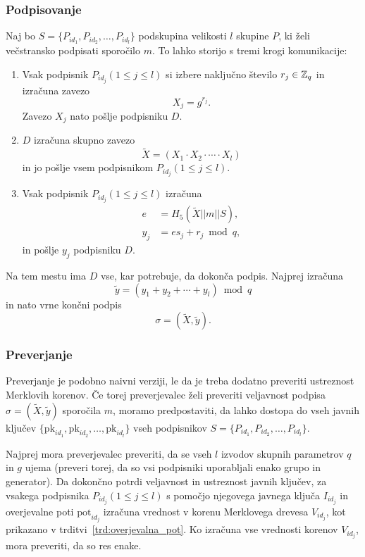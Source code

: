 \subsubsection{Podpisovanje}
Naj bo $S = \{P_{id_1}, P_{id_2}, \dots, P_{id_l}\}$ podskupina velikosti $l$ skupine $P$, ki želi
večstransko podpisati sporočilo $m$. To lahko storijo s tremi krogi komunikacije:
\begin{enumerate}
    \item Vsak podpisnik $P_{id_j} (1 \le j \le l)$ si izbere naključno število $r_j \in \mathbb Z_q$
        in izračuna zavezo
        $$
        X_j = g^{r_j}.
        $$
        Zavezo $X_j$ nato pošlje podpisniku $D$.
    \item $D$ izračuna skupno zavezo
        $$
        \tilde{X} = (X_1 \cdot X_2 \cdot \cdots \cdot X_l)
        $$
        in jo pošlje vsem podpisnikom $P_{id_j} (1 \le j \le l)$.
    \item Vsak podpisnik $P_{id_j} (1 \le j \le l)$ izračuna
        \begin{align*}
            e &= H_5(\tilde{X} || m || S), \\
            y_j &= e s_j + r_j \bmod q,
        \end{align*}
        in pošlje $y_j$ podpisniku $D$.
\end{enumerate}
Na tem mestu ima $D$ vse, kar potrebuje, da dokonča podpis. Najprej izračuna
$$
\tilde{y} = (y_1 + y_2 + \cdots + y_l) \bmod q
$$
in nato vrne končni podpis
$$
\sigma = (\tilde{X}, \tilde{y}).
$$

\subsubsection{Preverjanje}
Preverjanje je podobno naivni verziji, le da je treba dodatno preveriti ustreznost Merklovih
korenov. Če torej preverjevalec želi preveriti veljavnost podpisa $\sigma = (\tilde{X}, \tilde{y})$
sporočila $m$, moramo predpostaviti, da lahko dostopa do vseh javnih ključev $\{\text{pk}_{id_1},
\text{pk}_{id_2}, \dots, \text{pk}_{id_l}\}$ vseh podpisnikov $S = \{P_{id_1}, P_{id_2}, \dots, 
P_{id_l}\}$.

Najprej mora preverjevalec preveriti, da se vseh $l$ izvodov skupnih parametrov $q$ in $g$ ujema (preveri
torej, da so vsi podpisniki uporabljali enako grupo in generator). Da dokončno potrdi veljavnost in
ustreznost javnih ključev, za vsakega podpisnika $P_{id_j} (1 \le j \le l)$ s pomočjo njegovega javnega
ključa $I_{id_j}$ in overjevalne poti $\text{pot}_{id_j}$ izračuna vrednost v korenu Merklovega drevesa
$V_{id_j}$, kot prikazano v trditvi~\ref{trd:overjevalna_pot}. Ko izračuna vse vrednosti korenov
$V_{id_j}$, mora preveriti, da so res enake.

